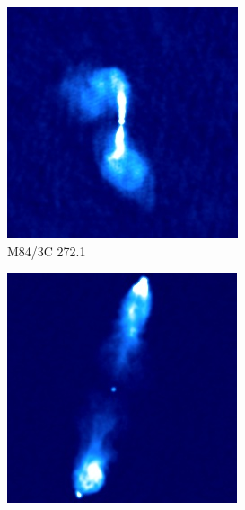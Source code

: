         \begin{figure}
            \centering
            \begin{subfigure}{0.45\textwidth}
                \includegraphics[width=\textwidth]{images/3C_272.1.jpg}
                \caption{M84/3C 272.1}
                \label{fig:m84}
            \end{subfigure}
            \begin{subfigure}{0.45\textwidth}
                \includegraphics[width=\textwidth]{images/3C_223.jpg}

\end{subfigure}
\end{figure}
